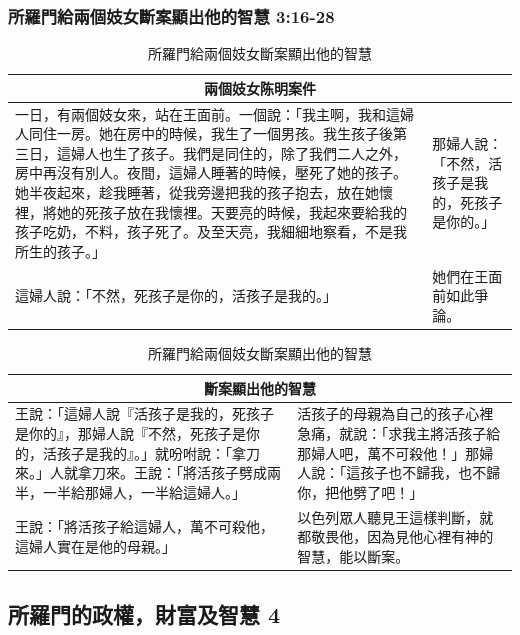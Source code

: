 

\subsubsection{所羅門給兩個妓女斷案顯出他的智慧 3:16-28}
\begin{table}[H]
\begin{tabular}{p{}|p{}}\hline
\multicolumn{2}{c}{兩個妓女陈明案件}\\\hline\hline
一日，有兩個妓女來，站在王面前。一個說：「我主啊，我和這婦人同住一房。她在房中的時候，我生了一個男孩。我生孩子後第三日，這婦人也生了孩子。我們是同住的，除了我們二人之外，房中再沒有別人。夜間，這婦人睡著的時候，壓死了她的孩子。她半夜起來，趁我睡著，從我旁邊把我的孩子抱去，放在她懷裡，將她的死孩子放在我懷裡。天要亮的時候，我起來要給我的孩子吃奶，不料，孩子死了。及至天亮，我細細地察看，不是我所生的孩子。」 &那婦人說：「不然，活孩子是我的，死孩子是你的。」\\\hline
這婦人說：「不然，死孩子是你的，活孩子是我的。」&她們在王面前如此爭論。\\\hline
\end{tabular}
\quad
\begin{tabular}{p{}|p{3.25cm}}\hline
\multicolumn{2}{c}{斷案顯出他的智慧}\\\hline\hline
王說：「這婦人說『活孩子是我的，死孩子是你的』，那婦人說『不然，死孩子是你的，活孩子是我的』。」就吩咐說：「拿刀來。」人就拿刀來。王說：「將活孩子劈成兩半，一半給那婦人，一半給這婦人。」 &活孩子的母親為自己的孩子心裡急痛，就說：「求我主將活孩子給那婦人吧，萬不可殺他！」那婦人說：「這孩子也不歸我，也不歸你，把他劈了吧！」\\\hline
王說：「將活孩子給這婦人，萬不可殺他，這婦人實在是他的母親。」&以色列眾人聽見王這樣判斷，就都敬畏他，因為見他心裡有神的智慧，能以斷案。\\\hline
\end{tabular}
\caption{所羅門給兩個妓女斷案顯出他的智慧}
\end{table}

\subsection{所羅門的政權，財富及智慧 4}
